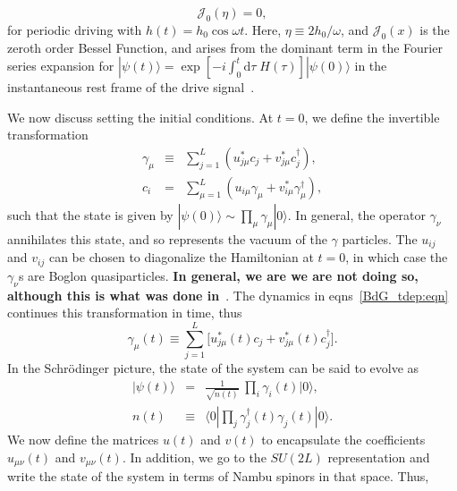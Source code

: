 \documentclass[a4paper,10pt]{article}
\begin{document}
\begin{equation}
\label{eq:freezing}
\mathcal{J}_0(\eta)=0,
\end{equation}
for periodic driving with $h(t)=h_0 \cos{\omega t}$. Here, $\eta\equiv {2h_0}/{\omega}$, and $\mathcal{J}_0(x)$ is the zeroth order Bessel Function, and arises from the dominant term in the Fourier series expansion for $|\psi(t)\rangle = \exp{\left[-i\int^t_0 \mathrm{d}\tau\; H(\tau)\right]}|\psi(0)\rangle$ in the instantaneous rest frame of the drive signal~\cite{arnab1}.

We now discuss setting the initial conditions. At $t=0$, we define the invertible transformation
\begin{eqnarray}
\label{eq:gammadef}
\gamma_\mu &\equiv& \sum^L_{j=1} \left(u^\ast_{j\mu}c_j+v^\ast_{j\mu}c^\dagger_j\right), \nonumber \\
c_i &=& \sum^L_{\mu=1} \left(u_{i\mu}\gamma_\mu+v^\ast_{i\mu}\gamma^\dagger_\mu\right),
\end{eqnarray}
such that the state is given by $|\psi(0)\rangle \sim \prod_\mu \gamma_\mu|0\rangle$. In general, the operator $\gamma_\nu$ annihilates this state, and so represents the vacuum of the $\gamma$ particles. The $u_{ij}$ and $v_{ij}$ can be chosen to diagonalize the Hamiltonian at $t=0$, in which case the $\gamma_\nu$s are Boglon quasiparticles. \textbf{In general, we are we are not doing so, although this is what was done in}~\cite{isingrand}. The dynamics in eqns~\ref{BdG_tdep:eqn} continues this transformation in time, thus
\begin{equation}
\label{eq:gammat}
\gamma_\mu(t) \equiv \sum^L_{j=1} \bigg[u^\ast_{j\mu}(t)c_j+v^\ast_{j\mu}(t)c^\dagger_j\bigg].
\end{equation}
In the Schr\"odinger picture, the state of the system can be said to evolve as 
\begin{eqnarray}
\label{eq:psit}
|\psi(t)\rangle  &=&   \frac{1}{\sqrt{n(t)}}\ \prod_i \gamma_i(t)|0\rangle,\nonumber \\
n(t)           &\equiv&  \langle 0 |\prod_j \gamma^\dagger_j(t)\gamma_j(t)|0\rangle.
\end{eqnarray}
We now define the matrices $u(t)$ and $v(t)$ to encapsulate the coefficients $u_{\mu\nu}(t)$ and $v_{\mu\nu}(t)$. In addition, we go to the $SU(2L)$ representation and write the state of the system in terms of Nambu spinors in that space. Thus,
\end{document}
